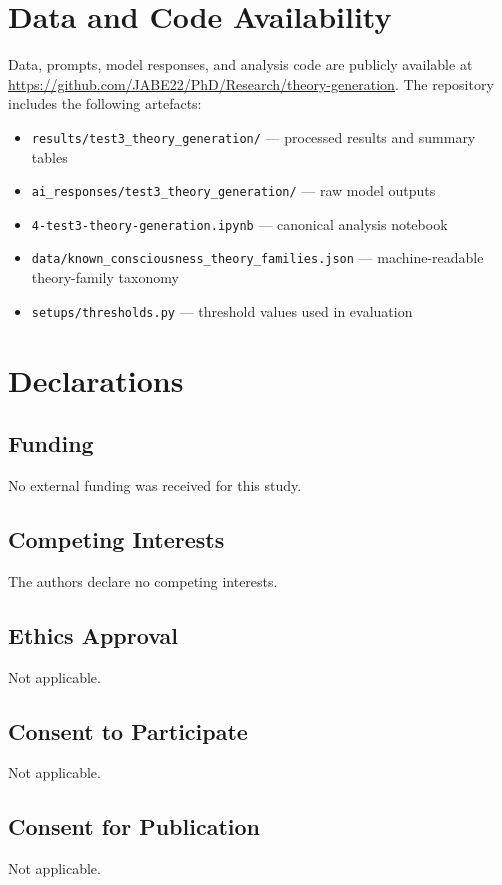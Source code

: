 \documentclass[pdflatex,sn-mathphys-num]{sn-jnl}
\begin{document}
\section*{Data and Code Availability}

Data, prompts, model responses, and analysis code are publicly available at
\url{https://github.com/JABE22/PhD/Research/theory-generation}.
The repository includes the following artefacts:
\begin{itemize}
  \item \texttt{results/test3\_theory\_generation/} --- processed results and summary tables
  \item \texttt{ai\_responses/test3\_theory\_generation/} --- raw model outputs
  \item \texttt{4-test3-theory-generation.ipynb} --- canonical analysis notebook
  \item \texttt{data/known\_consciousness\_theory\_families.json} --- machine-readable theory-family taxonomy
  \item \texttt{setups/thresholds.py} --- threshold values used in evaluation
\end{itemize}

\section*{Declarations}

\subsection*{Funding}
No external funding was received for this study.

\subsection*{Competing Interests}
The authors declare no competing interests.

\subsection*{Ethics Approval}
Not applicable.

\subsection*{Consent to Participate}
Not applicable.

\subsection*{Consent for Publication}
Not applicable.


\end{document}
